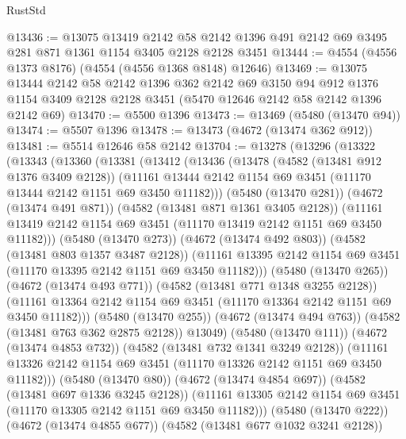 \begin{lexlean}{RustStd}
\begin{coremodule}
@13436 := @13075
    @13419
    @2142
    @58
    @2142
    @1396
    @491
    @2142
    @69
    @3495
    @281
    @871
    @1361
    @1154
    @3405
    @2128
    @2128
    @3451
@13444 := @4554 (@4556 @1373 @8176) (@4554 (@4556 @1368 @8148) @12646)
@13469 := @13075
    @13444
    @2142
    @58
    @2142
    @1396
    @362
    @2142
    @69
    @3150
    @94
    @912
    @1376
    @1154
    @3409
    @2128
    @2128
    @3451
    (@5470 @12646 @2142 @58 @2142 @1396 @2142 @69)
@13470 := @5500 @1396
@13473 := @13469 (@5480 (@13470 @94))
@13474 := @5507 @1396
@13478 := @13473 (@4672 (@13474 @362 @912))
@13481 := @5514 @12646 @58 @2142
@13704 := @13278
    (@13296
      (@13322
        (@13343
          (@13360
            (@13381
              (@13412
                (@13436
                  (@13478
                    (@4582 (@13481 @912 @1376 @3409 @2128))
                    (@11161
                      @13444
                      @2142
                      @1154
                      @69
                      @3451
                      (@11170 @13444 @2142 @1151 @69 @3450 @11182)))
                  (@5480 (@13470 @281))
                  (@4672 (@13474 @491 @871))
                  (@4582 (@13481 @871 @1361 @3405 @2128))
                  (@11161
                    @13419
                    @2142
                    @1154
                    @69
                    @3451
                    (@11170 @13419 @2142 @1151 @69 @3450 @11182)))
                (@5480 (@13470 @273))
                (@4672 (@13474 @492 @803))
                (@4582 (@13481 @803 @1357 @3487 @2128))
                (@11161 @13395 @2142 @1154 @69 @3451 (@11170 @13395 @2142 @1151 @69 @3450 @11182)))
              (@5480 (@13470 @265))
              (@4672 (@13474 @493 @771))
              (@4582 (@13481 @771 @1348 @3255 @2128))
              (@11161 @13364 @2142 @1154 @69 @3451 (@11170 @13364 @2142 @1151 @69 @3450 @11182)))
            (@5480 (@13470 @255))
            (@4672 (@13474 @494 @763))
            (@4582 (@13481 @763 @362 @2875 @2128))
            @13049)
          (@5480 (@13470 @111))
          (@4672 (@13474 @4853 @732))
          (@4582 (@13481 @732 @1341 @3249 @2128))
          (@11161 @13326 @2142 @1154 @69 @3451 (@11170 @13326 @2142 @1151 @69 @3450 @11182)))
        (@5480 (@13470 @80))
        (@4672 (@13474 @4854 @697))
        (@4582 (@13481 @697 @1336 @3245 @2128))
        (@11161 @13305 @2142 @1154 @69 @3451 (@11170 @13305 @2142 @1151 @69 @3450 @11182)))
      (@5480 (@13470 @222))
      (@4672 (@13474 @4855 @677))
      (@4582 (@13481 @677 @1032 @3241 @2128))

\end{coremodule}
\end{lexlean}
